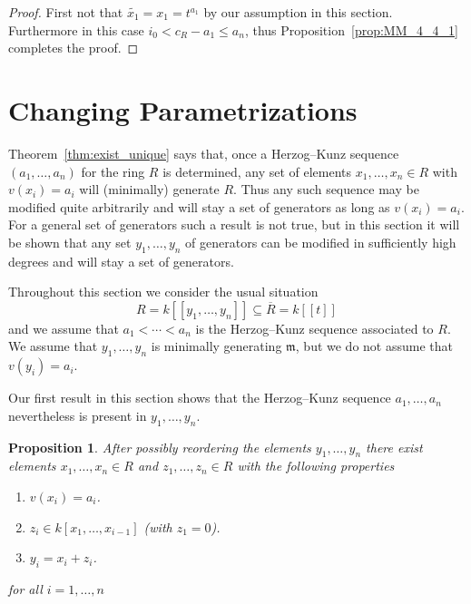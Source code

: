 \documentclass[12pt]{amsart}
\theoremstyle{plain}%
\newtheorem{proposition}[satz]{Proposition}
\theoremstyle{definition}
\renewcommand{\(}{\left(}
\renewcommand{\)}{\right)}
\renewcommand{\leq}{\leqslant}
\begin{document}
\begin{proof}
First not that $\widetilde{x_1} = x_1 = t^{a_1}$ by our 
assumption in this section. Furthermore in this case 
$i_0 < c_R -a_1 \leq a_n$, thus 
Proposition~\ref{prop:MM_4_4_1} completes the proof. 
\end{proof}

\section{Changing Parametrizations}

Theorem~\ref{thm:exist_unique} says that, once a 
Herzog--Kunz sequence $(a_1, \ldots, a_n)$ for the ring 
$R$ is determined, any set of elements $x_1, \ldots , x_n 
\in R$ with $v(x_i) = a_i$ will (minimally) generate $R$. 
Thus any such sequence may be modified quite arbitrarily and 
will stay a set of generators as long as $v(x_i) = a_i$. For 
a general set of generators such a result is not true, but 
in this section it will be shown that any set $y_1, \ldots, 
y_n$ of generators can be modified in sufficiently high 
degrees and will stay a set of generators. 

Throughout this section we consider the usual situation 
	$$ R = k[[y_1, \ldots , y_n]] \subseteq \overline{R} 
        = k[[t]] $$
and we assume that $a_1 < \cdots < a_n$ is the Herzog--Kunz 
sequence associated to $R$. We assume that $y_1, \ldots, 
y_n$ is minimally generating $\mathfrak m$, but we do not 
assume that $v(y_i) = a_i$. 

Our first result in this section shows that the Herzog--Kunz 
sequence $a_1, \ldots, a_n$ nevertheless is present in 
$y_1, \ldots, y_n$. 

\begin{proposition}\label{prop:optimal_part}
After possibly reordering the elements $y_1, \ldots, y_n$ 
there exist elements $x_1, \ldots, x_n \in R$ and 
$z_1, \ldots, z_n \in R$ with the following properties 
\begin{enumerate}
\item $v(x_i) = a_i$. 
\item $z_i \in k[x_1, \ldots, x_{i-1}]$ (with $z_1 = 0$).
\item $y_i = x_i + z_i$. 
\end{enumerate}
 for all $i = 1, \ldots , n$
\end{proposition}
\end{document}
